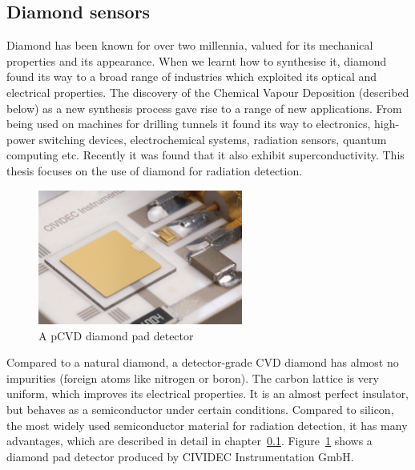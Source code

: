 \documentclass[twoside,12pt]{packages/mytustyle}  %
\begin{document}
\subsection{Diamond sensors}
Diamond has been known for over two millennia, valued for its mechanical properties and its appearance. When we learnt how to synthesise it, diamond found its way to a broad range of industries which exploited its optical and electrical properties. The discovery of the Chemical Vapour Deposition (described below) as a new synthesis process gave rise to a range of new applications. From being used on machines for drilling tunnels it found its way to electronics, high-power switching devices, electrochemical systems, radiation sensors, quantum computing etc. Recently it was found that it also exhibit superconductivity. This thesis focuses on the use of diamond for radiation detection.
\begin{figure}[!t]
\centering
\includegraphics[width=0.6\textwidth]{pics/cividecpcvd}
\caption{A pCVD diamond pad detector \cite{Cividec:00000}}
\label{fig:cividecpcvd}
\end{figure}
Compared to a natural diamond, a detector-grade CVD diamond has almost no impurities (foreign atoms like nitrogen or boron). The carbon lattice is very uniform, which improves its electrical properties. It is an almost perfect insulator, but behaves as a semiconductor under certain conditions. Compared to silicon, the most widely used semiconductor material for radiation detection, it has many advantages, which are described in detail in chapter~\ref{}. Figure~\ref{fig:cividecpcvd} shows a diamond pad detector produced by CIVIDEC Instrumentation GmbH.
\end{document}
